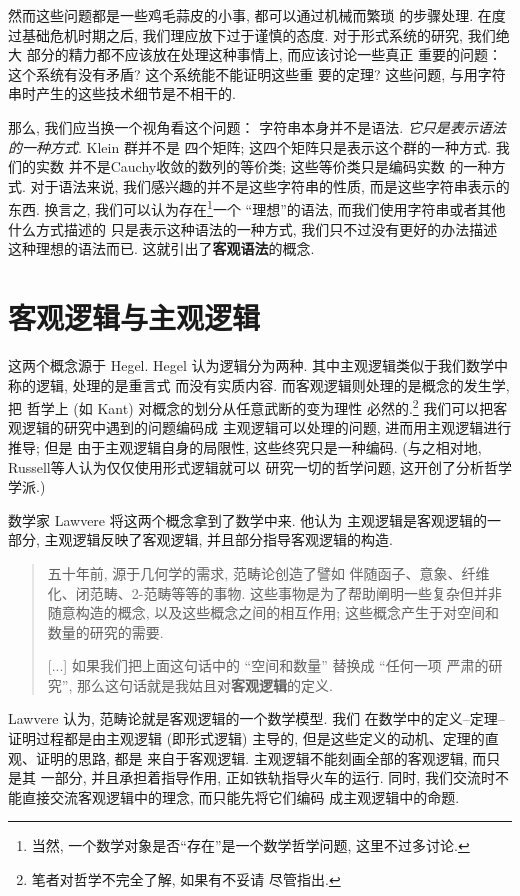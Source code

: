 \documentclass[UTF8]{ctexbook}
\theoremstyle{plain}
\theoremstyle{definition}
\theoremstyle{remark}
\begin{document}
然而这些问题都是一些鸡毛蒜皮的小事, 都可以通过机械而繁琐
的步骤处理. 在度过基础危机时期之后,
我们理应放下过于谨慎的态度. 对于形式系统的研究, 我们绝大
部分的精力都不应该放在处理这种事情上, 而应该讨论一些真正
重要的问题： 这个系统有没有矛盾? 这个系统能不能证明这些重
要的定理? 这些问题, 与用字符串时产生的这些技术细节是不相干的.

那么, 我们应当换一个视角看这个问题： 字符串本身并不是语法.
\emph{它只是表示语法的一种方式}. Klein 群并不是
四个矩阵; 这四个矩阵只是表示这个群的一种方式. 我们的实数
并不是Cauchy收敛的数列的等价类; 这些等价类只是编码实数
的一种方式. 对于语法来说, 我们感兴趣的并不是这些字符串的性质,
而是这些字符串表示的东西. 换言之, 我们可以认为存在\footnote{当然,
一个数学对象是否“存在”是一个数学哲学问题, 这里不过多讨论.}一个
“理想”的语法, 而我们使用字符串或者其他什么方式描述的
只是表示这种语法的一种方式, 我们只不过没有更好的办法描述
这种理想的语法而已. 这就引出了\textbf{客观语法}的概念.

\section{客观逻辑与主观逻辑}
这两个概念源于 Hegel. Hegel 认为逻辑分为两种.
其中主观逻辑类似于我们数学中称的逻辑, 处理的是重言式
而没有实质内容. 而客观逻辑则处理的是概念的发生学, 把
哲学上 (如 Kant) 对概念的划分从任意武断的变为理性
必然的.\footnote{笔者对哲学不完全了解, 如果有不妥请
尽管指出.} 我们可以把客观逻辑的研究中遇到的问题编码成
主观逻辑可以处理的问题, 进而用主观逻辑进行推导; 但是
由于主观逻辑自身的局限性, 这些终究只是一种编码.
(与之相对地, Russell等人认为仅仅使用形式逻辑就可以
研究一切的哲学问题, 这开创了分析哲学学派.)

数学家 Lawvere 将这两个概念拿到了数学中来. 他认为
主观逻辑是客观逻辑的一部分, 主观逻辑反映了客观逻辑,
并且部分指导客观逻辑的构造.
\begin{quotation}
五十年前, 源于几何学的需求, 范畴论创造了譬如
伴随函子、意象、纤维化、闭范畴、2-范畴等等的事物.
这些事物是为了帮助阐明一些复杂但并非随意构造的概念,
以及这些概念之间的相互作用; 这些概念产生于对空间和
数量的研究的需要.

[...] 如果我们把上面这句话中的 “空间和数量” 替换成 “任何一项
严肃的研究”, 那么这句话就是我姑且对\textbf{客观逻辑}的定义.%
~\cite{lawvere:1994:objective}
\end{quotation}
Lawvere 认为, 范畴论就是客观逻辑的一个数学模型. 我们
在数学中的定义--定理--证明过程都是由主观逻辑 (即形式逻辑)
主导的, 但是这些定义的动机、定理的直观、证明的思路, 都是
来自于客观逻辑. 主观逻辑不能刻画全部的客观逻辑, 而只是其
一部分, 并且承担着指导作用, 正如铁轨指导火车的运行. 同时,
我们交流时不能直接交流客观逻辑中的理念, 而只能先将它们编码
成主观逻辑中的命题.
\end{document}
